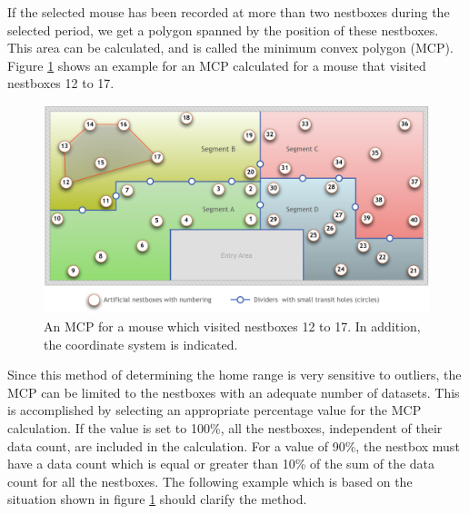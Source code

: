 If the selected mouse has been recorded at more than two nestboxes during the selected period, we get a polygon spanned by the position of these nestboxes. This area can be calculated, and is called the minimum convex polygon (MCP). Figure \ref{fig:mcp} shows an example for an MCP calculated for a mouse that visited nestboxes 12 to 17. 

\begin{figure}[htpb]
\begin{center}
  \includegraphics[width=.75\textwidth]{assets/pdf/mcp.pdf}
  \caption[Minimum convex polygon (MCP)]{An MCP for a mouse which visited nestboxes 12 to 17. In addition, the coordinate system is indicated.}
  \label{fig:mcp}
\end{center}
\end{figure}

Since this method of determining the home range is very sensitive to outliers, the MCP can be limited to the nestboxes with an adequate number of datasets. This is accomplished by selecting an appropriate percentage value for the MCP calculation. If the value is set to 100\%, all the nestboxes, independent of their data count, are included in the calculation. For a value of 90\%, the nestbox must have a data count which is equal or greater than 10\% of the sum of the data count for all the nestboxes. The following example which is based on the situation shown in figure \ref{fig:mcp} should clarify the method.

